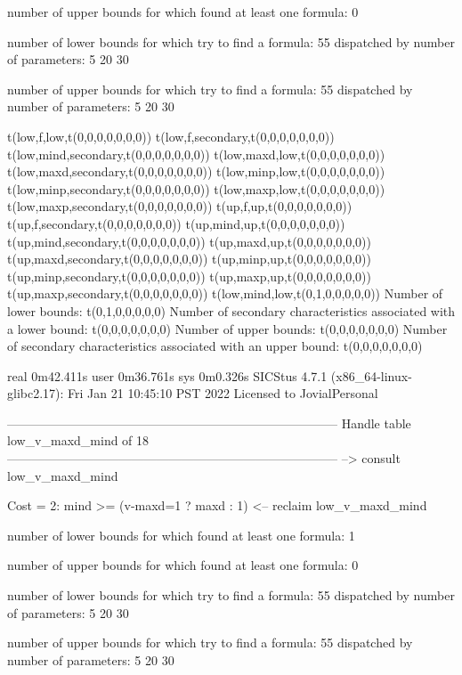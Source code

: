 number of upper bounds for which found at least one formula: 0

number of lower bounds for which try to find a formula: 55
dispatched by number of parameters: 5  20  30

number of upper bounds for which try to find a formula: 55
dispatched by number of parameters: 5  20  30

t(low,f,low,t(0,0,0,0,0,0,0))
t(low,f,secondary,t(0,0,0,0,0,0,0))
t(low,mind,secondary,t(0,0,0,0,0,0,0))
t(low,maxd,low,t(0,0,0,0,0,0,0))
t(low,maxd,secondary,t(0,0,0,0,0,0,0))
t(low,minp,low,t(0,0,0,0,0,0,0))
t(low,minp,secondary,t(0,0,0,0,0,0,0))
t(low,maxp,low,t(0,0,0,0,0,0,0))
t(low,maxp,secondary,t(0,0,0,0,0,0,0))
t(up,f,up,t(0,0,0,0,0,0,0))
t(up,f,secondary,t(0,0,0,0,0,0,0))
t(up,mind,up,t(0,0,0,0,0,0,0))
t(up,mind,secondary,t(0,0,0,0,0,0,0))
t(up,maxd,up,t(0,0,0,0,0,0,0))
t(up,maxd,secondary,t(0,0,0,0,0,0,0))
t(up,minp,up,t(0,0,0,0,0,0,0))
t(up,minp,secondary,t(0,0,0,0,0,0,0))
t(up,maxp,up,t(0,0,0,0,0,0,0))
t(up,maxp,secondary,t(0,0,0,0,0,0,0))
t(low,mind,low,t(0,1,0,0,0,0,0))
Number of lower bounds:                                             t(0,1,0,0,0,0,0)
Number of secondary characteristics associated with a lower bound:  t(0,0,0,0,0,0,0)
Number of upper bounds:                                             t(0,0,0,0,0,0,0)
Number of secondary characteristics associated with an upper bound: t(0,0,0,0,0,0,0)

real	0m42.411s
user	0m36.761s
sys	0m0.326s
SICStus 4.7.1 (x86_64-linux-glibc2.17): Fri Jan 21 10:45:10 PST 2022
Licensed to JovialPersonal


--------------------------------------------------------------------------------
Handle table low_v_maxd_mind of 18
--------------------------------------------------------------------------------
--> consult low_v_maxd_mind

Cost =  2:  mind >= (v-maxd=1 ? maxd : 1)
<-- reclaim low_v_maxd_mind

number of lower bounds for which found at least one formula: 1

number of upper bounds for which found at least one formula: 0

number of lower bounds for which try to find a formula: 55
dispatched by number of parameters: 5  20  30

number of upper bounds for which try to find a formula: 55
dispatched by number of parameters: 5  20  30

